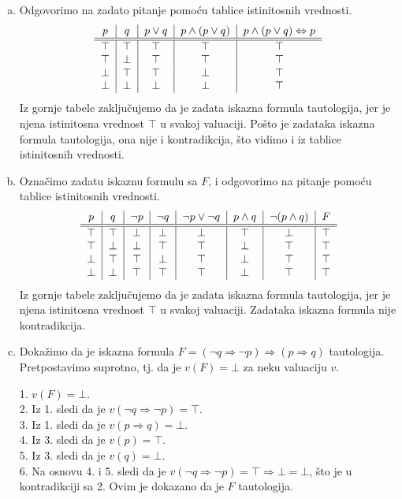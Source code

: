 \begin{enumerate}[(a)]
\item Odgovorimo na zadato pitanje pomo\' cu tablice istinitosnih vrednosti.
\[\begin{tabular}{c|c|c|c|c}
$p$ & $q$ & $p\vee q$ & $p\wedge(p\vee q)$ & $p\wedge (p\vee q)\Leftrightarrow p$\\
\hline\hline
$\top$ & $\top$ & $\top$ & $\top$ & $\top$\\
$\top$ & $\bot$ & $\top$ & $\top$ & $\top$\\
$\bot$ & $\top$ & $\top$ & $\bot$ & $\top$\\
$\bot$ & $\bot$ & $\bot$ & $\bot$ & $\top$\\
\end{tabular}\]
Iz gornje tabele zaklju\v cujemo da je zadata iskazna formula tautologija, jer je njena istinitosna vrednost $\top$ u svakoj valuaciji. Po\v sto je zadataka iskazna formula tautologija, ona nije i kontradikcija, \v sto vidimo i iz tablice istinitosnih vrednosti.

\item Ozna\v cimo zadatu iskaznu formulu sa $F$, i odgovorimo na pitanje pomo\' cu tablice istinitosnih vrednosti.
\[\begin{tabular}{c|c|c|c|c|c|c|c}
$p$ & $q$ & $\neg p$ & $\neg q$ & $\neg p\vee\neg q$ & $p\wedge q$ & $\neg(p\wedge q)$ & $F$\\
\hline\hline
$\top$ & $\top$ & $\bot$ & $\bot$ & $\bot$ & $\top$ & $\bot$ & $\top$ \\
$\top$ & $\bot$ & $\bot$ & $\top$ & $\top$ & $\bot$ & $\top$ & $\top$ \\
$\bot$ & $\top$ & $\top$ & $\bot$ & $\top$ & $\bot$ & $\top$ & $\top$ \\
$\bot$ & $\bot$ & $\top$ & $\top$ & $\top$ & $\bot$ & $\top$ & $\top$ \\
\end{tabular}\]
Iz gornje tabele zaklju\v cujemo da je zadata iskazna formula tautologija, jer je njena istinitosna vrednost $\top$ u svakoj valuaciji. Zadataka iskazna formula nije kontradikcija.

\item Doka\v zimo da je iskazna formula $F=(\neg q\Rightarrow\neg p)\Rightarrow(p\Rightarrow q)$ tautologija. Pretpostavimo suprotno, tj. da je $v(F)=\bot$ za neku valuaciju $v$.

1. $v(F)=\bot$.\\
2. Iz 1. sledi da je $v(\neg q\Rightarrow\neg p)=\top$.\\
3. Iz 1. sledi da je $v(p\Rightarrow q)=\bot$.\\
4. Iz 3. sledi da je $v(p)=\top$.\\
5. Iz 3. sledi da je $v(q)=\bot$.\\
6. Na osnovu 4. i 5. sledi da je $v(\neg q\Rightarrow\neg p)=\top\Rightarrow \bot=\bot$, \v sto je u kontradikciji sa 2. Ovim je dokazano da je $F$ tautologija.


\end{enumerate}
